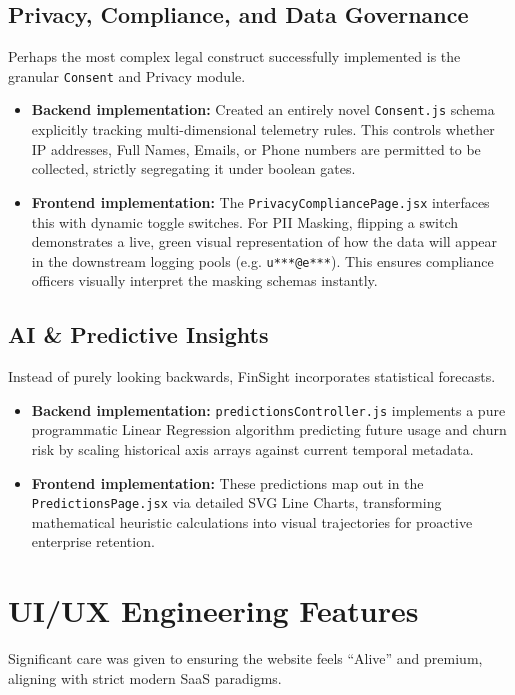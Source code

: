 \documentclass[12pt,a4paper]{report}
\begin{document}
\section{Privacy, Compliance, and Data Governance}
Perhaps the most complex legal construct successfully implemented is the granular \texttt{Consent} and Privacy module. 
\begin{itemize}
    \item \textbf{Backend implementation:} Created an entirely novel \texttt{Consent.js} schema explicitly tracking multi-dimensional telemetry rules. This controls whether IP addresses, Full Names, Emails, or Phone numbers are permitted to be collected, strictly segregating it under boolean gates.
    \item \textbf{Frontend implementation:} The \texttt{PrivacyCompliancePage.jsx} interfaces this with dynamic toggle switches. For PII Masking, flipping a switch demonstrates a live, green visual representation of how the data will appear in the downstream logging pools (e.g. \texttt{u***@e***}). This ensures compliance officers visually interpret the masking schemas instantly.
\end{itemize}

\section{AI \& Predictive Insights}
Instead of purely looking backwards, FinSight incorporates statistical forecasts.
\begin{itemize}
    \item \textbf{Backend implementation:} \texttt{predictionsController.js} implements a pure programmatic Linear Regression algorithm predicting future usage and churn risk by scaling historical axis arrays against current temporal metadata.
    \item \textbf{Frontend implementation:} These predictions map out in the \texttt{PredictionsPage.jsx} via detailed SVG Line Charts, transforming mathematical heuristic calculations into visual trajectories for proactive enterprise retention.
\end{itemize}

\chapter{UI/UX Engineering Features}
Significant care was given to ensuring the website feels ``Alive'' and premium, aligning with strict modern SaaS paradigms.
\end{document}
